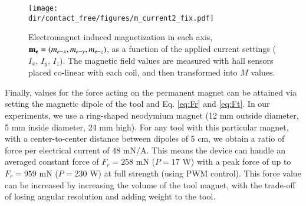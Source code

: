 \begin{figure}[!t]
    \centering
    \medskip
    \texttt{[image: \\dir/contact\_free/figures/m\_current2\_fix.pdf]}
    \caption{Electromagnet induced magnetization in each axis, $\mathbf{m_{e}} = (m_{e-x}, m_{e-y}, m_{e-z})$, as a function of the applied current settings ($I_x$, $I_y$, $I_z$). The magnetic field values are measured with hall sensors placed co-linear with each coil, and then transformed into $M$ values.}
    \label{fig:current_m}
\end{figure}

Finally, values for the force acting on the permanent magnet can be attained via setting the magnetic dipole of the tool and Eq. \ref{eq:Fr} and \ref{eq:Ft}. In our experiments, we use a ring-shaped neodymium magnet (12 mm outside diameter, 5 mm inside diameter, 24 mm high). For any tool with this particular magnet, with a center-to-center distance between dipoles of 5 cm, we obtain a ratio of force per electrical current of 48 mN/A. This means the device can handle an averaged constant force of $F_r=258$ mN ($P = 17$ W) with a peak force of up to $F_r = 959$ mN ($P = 230$ W) at full strength (using PWM control). This force value can be increased by increasing the volume of the tool magnet, with the trade-off of losing angular resolution and adding weight to the tool.